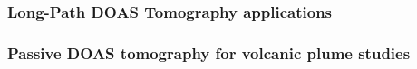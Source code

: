 \subsubsection{Long-Path DOAS Tomography applications}%
\label{ssub:long_path_doas_tomography_applications}


\subsubsection{Passive DOAS tomography for volcanic plume studies}%
\label{ssub:passive_doas_tomography_for_volcanic_plume_studies}
























